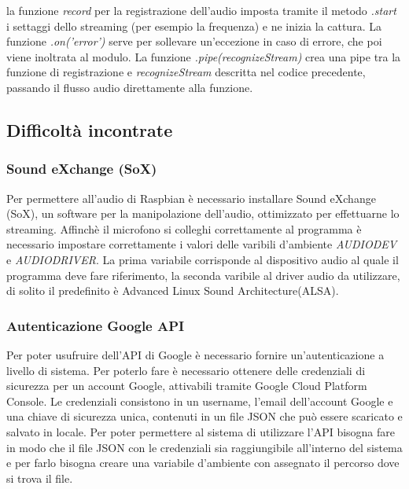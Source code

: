 la funzione \emph{record} per la registrazione dell'audio
imposta tramite il metodo \emph{.start} i settaggi dello streaming (per esempio la frequenza) e ne inizia la cattura.
La funzione \emph{.on('error')} serve per sollevare un'eccezione in caso di errore, che poi viene inoltrata al modulo.
La funzione \emph{.pipe(recognizeStream)} crea una pipe tra la funzione di registrazione e \emph{recognizeStream} descritta nel codice precedente,
passando il flusso audio direttamente alla funzione.

\subsection{Difficoltà incontrate}
\subsubsection{Sound eXchange (SoX)}\label{cap:sox}
Per permettere all'audio di
Raspbian \`e necessario installare Sound eXchange (SoX), un software per la manipolazione
dell'audio, ottimizzato per effettuarne lo streaming.
Affinch\`e il microfono si colleghi correttamente al programma \`e necessario impostare correttamente
i valori delle varibili d'ambiente \textit{AUDIODEV} e \textit{AUDIODRIVER}.
La prima variabile corrisponde al dispositivo audio al quale il programma deve fare riferimento,
la seconda varibile al driver audio da utilizzare, di solito il predefinito \`e Advanced Linux Sound Architecture(ALSA).

\subsubsection{Autenticazione Google API}\label{cap:google}
Per poter usufruire dell'API di Google \`e necessario fornire un'autenticazione a livello
di sistema.
Per poterlo fare \`e necessario ottenere delle credenziali di sicurezza per un account Google,
attivabili tramite Google Cloud Platform Console.
Le credenziali consistono in un username, l'email dell'account Google e una chiave di sicurezza unica,
 contenuti in un file JSON che pu\`o essere scaricato e salvato in locale.
Per poter permettere al sistema di utilizzare l'API bisogna fare in modo che il file JSON con le credenziali sia
raggiungibile all'interno del sistema e per farlo bisogna creare una variabile d'ambiente con assegnato il percorso
dove si trova il file.

